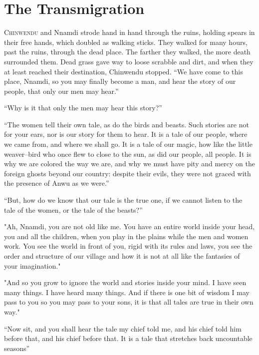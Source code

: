 \chapter{The Transmigration}

\lettrine{C}{hinwendu} and Nnamdi strode hand in hand through the ruins, holding spears in their free hands, which doubled as walking sticks. They walked for many hours, past the ruins, through the dead place. The farther they walked, the more death surrounded them. Dead grass gave way to loose scrabble and dirt, and when they at least reached their destination, Chinwendu stopped.
\SmallVSpace
“We have come to this place, Nnamdi, so you may finally become a man, and hear the story of our people, that only our men may hear.”

“Why is it that only the men may hear this story?”

“The women tell their own tale, as do the birds and beasts. Such stories are not for your ears, nor is our story for them to hear. It is a tale of our people, where we came from, and where we shall go. It is a tale of our magic, how like the little weaver\mbox{--}bird who once flew to close to the sun, as did our people, all people. It is why we are colored the way we are, and why we must have pity and mercy on the foreign ghosts beyond our country: despite their evils, they were not graced with the presence of Anwu as we were.”

“But, how do we know that our tale is the true one, if we cannot listen to the tale of the women, or the tale of the beasts?”

"Ah, Nnamdi, you are not old like me. You have an entire world inside your head, you and all the children, when you play in the plains while the men and women work. You see the world in front of you, rigid with its rules and laws, you see the order and structure of our village and how it is not at all like the fantasies of your imagination."

"And so you grow to ignore the world and stories inside your mind. I have seen many things. I have heard many things. And if there is one bit of wisdom I may pass to you so you may pass to your sons, it is that all tales are true in their own way."

“Now sit, and you shall hear the tale my chief told me, and his chief told him before that, and his chief before that. It is a tale that stretches back uncountable seasons{\el}”
\simpleline
{}

